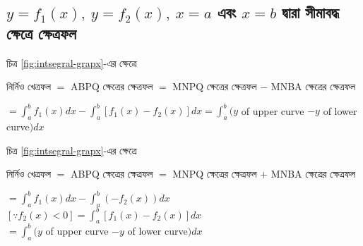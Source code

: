 \subsection{ $y = f_1(x),\: y = f_2(x),\:x=a$ এবং $x=b$ দ্বারা সীমাবদ্ধ ক্ষেত্রে ক্ষেত্রফল}

    \begin{minipage}{0.45\textwidth}
        চিত্র \ref{fig:intsegral-grapx}-এর ক্ষেত্রে

        নির্নিও খেত্রফল $=$ ABPQ ক্ষেত্রের ক্ষেত্রফল $=$ MNPQ ক্ষেত্রের ক্ষেত্রফল $-$ MNBA ক্ষেত্রের ক্ষেত্রফল

        $=\int_{a}^{b}f_1(x)dx - \int_{a}^{b}[f_1(x) - f_2(x)]dx = \int_{a}^{b} (y$ of upper curve $- y$ of lower curve$)dx$ 

        \centering
        \label{fig:intsegral-grapx}

        

    \end{minipage}
    \hfill
    \begin{minipage}{0.45\textwidth}
        
        চিত্র \ref{fig:intsegral-grapx}-এর ক্ষেত্রে

        নির্নিও খেত্রফল $=$ ABPQ ক্ষেত্রের ক্ষেত্রফল $=$ MNPQ ক্ষেত্রের ক্ষেত্রফল $+$ MNBA ক্ষেত্রের ক্ষেত্রফল

        $=\int_{a}^{b}f_1(x)dx - \int_{a}^{b}(- f_2(x))dx$ $[\because f_2(x) < 0 ] = \int_{a}^{b}[f_1(x) - f_2(x)]dx$\\
        $= \int_{a}^{b} (y$ of upper curve $- y$ of lower curve$)dx$ 

        \centering
        \label{fig:sintegral-grapd2}
    \end{minipage}

